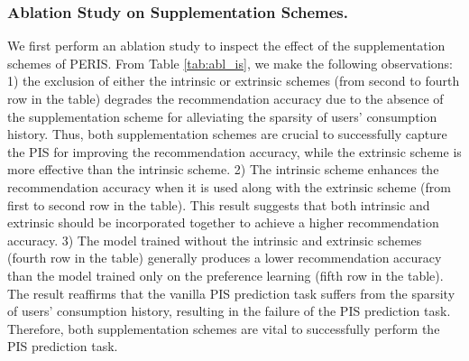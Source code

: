 \documentclass[sigconf]{acmart}
\newcommand{\MD}{{\small\textsf{PERIS}}}
\begin{document}
\subsubsection{\textbf{Ablation Study on Supplementation Schemes.}}
\label{sec:abl}
We first perform an ablation study to inspect the effect of the supplementation schemes of \MD{}.
From Table \ref{tab:abl_is}, we make the following observations: 1) the exclusion of either the intrinsic or extrinsic schemes (from second to fourth row in the table) degrades the recommendation accuracy due to the absence of the supplementation scheme for alleviating the sparsity of users' consumption history. Thus, both supplementation schemes are crucial to successfully capture the PIS for improving the recommendation accuracy, while the extrinsic scheme is more effective than the intrinsic scheme. 
2) The intrinsic scheme enhances the recommendation accuracy when it is used along with the extrinsic scheme (from first to second row in the table). This result suggests that both intrinsic and extrinsic should be incorporated together to achieve a higher recommendation accuracy. 
3) The model trained without the intrinsic and extrinsic schemes (fourth row in the table) generally produces a lower recommendation accuracy than the model trained only on the preference learning (fifth row in the table). The result reaffirms that the vanilla PIS prediction task suffers from the sparsity of users' consumption history, resulting in the failure of the PIS prediction task. Therefore, both supplementation schemes are vital to successfully perform the PIS prediction task. 
\end{document}
